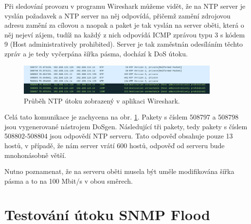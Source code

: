 Při sledování provozu v programu Wireshark můžeme vidět, že na NTP server je vyslán požadavek  a NTP server na něj odpovídá, přičemž zamění zdrojovou adresu zamění za cílovou a naopak a paket je tak vyslán na server oběti, která o něj nejeví zájem, tudíž na každý z nich odpovídá ICMP zprávou typu 3 s kódem 9 (Host administratively prohibited). Server je tak zaměstnán odesíláním těchto zpráv a je tedy vyčerpána šířka pásma, dochází k DoS útoku.

\begin{figure} [h]
	\centering
	\includegraphics[width=0.9\textwidth]
	{obrazky/mon_getlist_1_wireshark_with_icmp_and_reply.png}
	\caption{Průběh NTP útoku zobrazený v  aplikaci Wireshark.}
	\label{fig:mon_getlist_1_wireshark_with_icmp_and_reply-img}
\end{figure}

Celá tato komunikace je zachycena na obr. \ref{fig:mon_getlist_1_wireshark_with_icmp_and_reply-img}. Pakety s číslem 508797 a 508798 jsou vygenerované nástrojem DoSgen. Následující tři pakety, tedy pakety s číslem 508802-508804 jsou odpovědí NTP serveru. Tato odpověď obsahuje pouze 13 hostů, v případě, že nám server vrátí 600 hostů, odpověď od serveru bude mnohonásobně větší.

Nutno poznamenat, že na serveru oběti musela být uměle modifikována šířka pásma a to na 100 Mbit/s v obou směrech.

\section{Testování útoku SNMP Flood}




